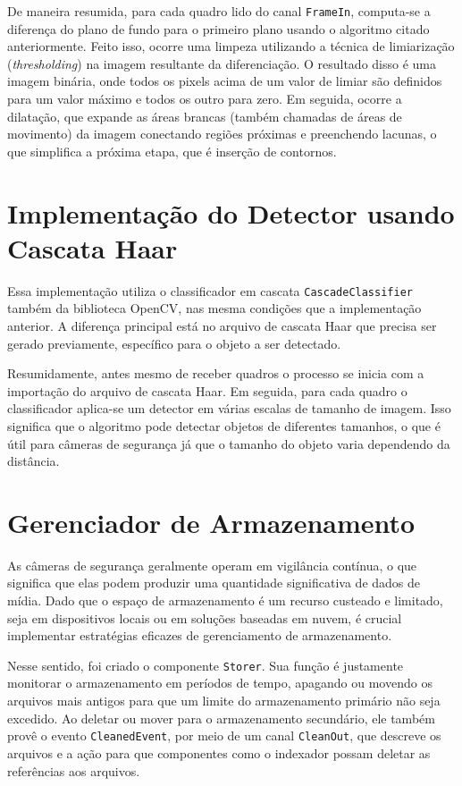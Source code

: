 \documentclass[12pt, %
openright, 
oneside, %
a4paper,    %
brazil]{facom-ufu-abntex2}
\begin{document}
De maneira resumida, para cada quadro lido do canal \texttt{FrameIn},
computa-se a diferença do plano de fundo para o primeiro plano usando o
algoritmo citado anteriormente. Feito isso, ocorre uma limpeza utilizando a
técnica de limiarização (\textit{thresholding}) na imagem resultante da
diferenciação. O resultado disso é uma imagem binária, onde todos os pixels
acima de um valor de limiar são definidos para um valor máximo e todos os outro
para zero. Em seguida, ocorre a dilatação, que expande as áreas brancas (também
chamadas de áreas de movimento) da imagem conectando regiões próximas e
preenchendo lacunas, o que simplifica a próxima etapa, que é inserção de
contornos.

\section{Implementação do Detector usando Cascata Haar}

Essa implementação utiliza o classificador em cascata
\texttt{CascadeClassifier} também da biblioteca OpenCV, nas mesma condições que
a implementação anterior. A diferença principal está no arquivo de cascata Haar
que precisa ser gerado previamente, específico para o objeto a ser detectado.

Resumidamente, antes mesmo de receber quadros o processo se inicia com a
importação do arquivo de cascata Haar. Em seguida, para cada quadro o
classificador aplica-se um detector em várias escalas de tamanho de imagem.
Isso significa que o algoritmo pode detectar objetos de diferentes tamanhos, o
que é útil para câmeras de segurança já que o tamanho do objeto varia
dependendo da distância.

\section{Gerenciador de Armazenamento}

As câmeras de segurança geralmente operam em vigilância contínua, o que
significa que elas podem produzir uma quantidade significativa de dados de
mídia. Dado que o espaço de armazenamento é um recurso custeado e limitado,
seja em dispositivos locais ou em soluções baseadas em nuvem, é crucial
implementar estratégias eficazes de gerenciamento de armazenamento.

Nesse sentido, foi criado o componente \texttt{Storer}. Sua função é justamente
monitorar o armazenamento em períodos de tempo, apagando ou movendo os arquivos
mais antigos para que um limite do armazenamento primário não seja excedido. Ao
deletar ou mover para o armazenamento secundário, ele também provê o evento
\texttt{CleanedEvent}, por meio de um canal \texttt{CleanOut}, que descreve os
arquivos e a ação para que componentes como o indexador possam deletar as
referências aos arquivos.
\end{document}
